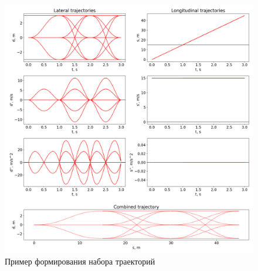 \begin{figure}[h]
      \centering
      \includegraphics[width=\linewidth]{images/2_project/quintic_2/multistep_trajectories}
            \caption{Пример формирования набора траекторий}
      \label{img:multistep_trajectories}
\end{figure}


